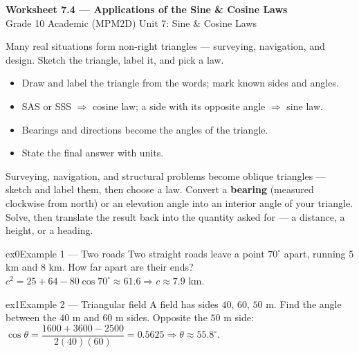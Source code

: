 \documentclass[11pt]{article}
\begin{document}
\begin{center}
{\LARGE\bfseries\color{titleblue}Worksheet 7.4 --- Applications of the Sine \& Cosine Laws}\\[2pt]
{\small Grade 10 Academic (MPM2D) \textperiodcentered{} Unit 7: Sine \& Cosine Laws}
\end{center}

\begin{ideabox}
Many real situations form non-right triangles --- surveying, navigation, and design. Sketch the triangle, label it, and pick a law.
\begin{itemize}[leftmargin=*,itemsep=2pt]
  \item Draw and label the triangle from the words; mark known sides and angles.
  \item SAS or SSS $\Rightarrow$ cosine law; a side with its opposite angle $\Rightarrow$ sine law.
  \item Bearings and directions become the angles of the triangle.
  \item State the final answer with units.
\end{itemize}
\end{ideabox}

\begin{learnbox}
Surveying, navigation, and structural problems become oblique triangles — sketch and label them, then choose a law.
Convert a \textbf{bearing} (measured clockwise from north) or an elevation angle into an interior angle of your triangle.
Solve, then translate the result back into the quantity asked for — a distance, a height, or a heading.
\end{learnbox}


\begin{example}{ex0}{Example 1 --- Two roads}
Two straight roads leave a point $70^\circ$ apart, running $5$ km and $8$ km. How far apart are their ends?
\soln $c^2=25+64-80\cos70^\circ\approx61.6\Rightarrow c\approx7.9$ km.
\end{example}

\begin{example}{ex1}{Example 2 --- Triangular field}
A field has sides $40$, $60$, $50$ m. Find the angle between the $40$ m and $60$ m sides.
\soln Opposite the $50$ m side: $\cos\theta=\dfrac{1600+3600-2500}{2(40)(60)}=0.5625\Rightarrow\theta\approx55.8^\circ.$
\end{example}
\end{document}
